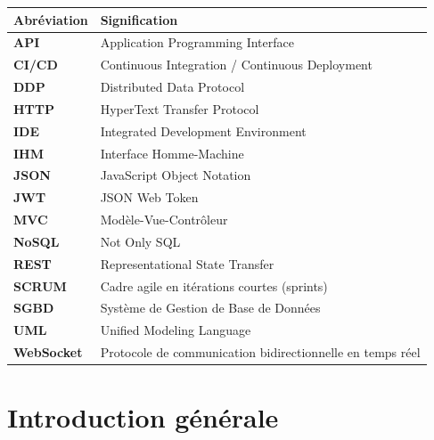\documentclass{rapportPFEHIND}
\begin{document}
\renewcommand{\arraystretch}{1.4}
\begin{tabular}{|>{\bfseries}p{3cm}|p{11cm}|}
\hline
\textbf{Abréviation} & \textbf{Signification} \\
\hline
API       & Application Programming Interface \\
\hline
CI/CD     & Continuous Integration / Continuous Deployment \\
\hline
DDP       & Distributed Data Protocol \\
\hline
HTTP      & HyperText Transfer Protocol \\
\hline
IDE       & Integrated Development Environment \\
\hline
IHM       & Interface Homme-Machine \\
\hline
JSON      & JavaScript Object Notation \\
\hline
JWT       & JSON Web Token \\
\hline
MVC       & Modèle-Vue-Contrôleur \\
\hline
NoSQL     & Not Only SQL \\
\hline
REST      & Representational State Transfer \\
\hline
SCRUM     & Cadre agile en itérations courtes (sprints) \\
\hline
SGBD      & Système de Gestion de Base de Données \\
\hline
UML       & Unified Modeling Language \\
\hline
WebSocket & Protocole de communication bidirectionnelle en temps réel \\
\hline
\end{tabular}
\renewcommand{\arraystretch}{1}

\cleardoublepage
{}
{}
\makeatletter
\begingroup\let\ps@plain\ps@fancy
\listoffigures
\endgroup
\makeatother
\newpage

\cleardoublepage
{}
{}
\makeatletter
\begingroup\let\ps@plain\ps@fancy
\listoftables
\endgroup
\makeatother
\newpage

\cleardoublepage
{}
{}
\makeatletter
\begingroup\let\ps@plain\ps@fancy
\tableofcontents
\endgroup
\makeatother
\newpage

\cleardoublepage
{}
\setcounter{page}{1}

\section*{Introduction générale}
\end{document}
